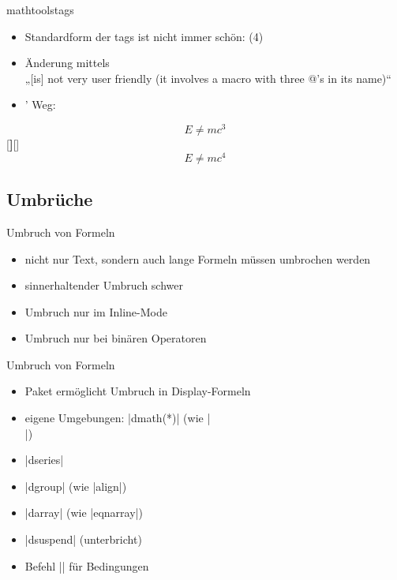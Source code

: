 \documentclass[
	vorläufig=false,
	datum=2022-11-02,
	titel={Mathematiksatz II},
	web=true,
	max,
	aspectratio=1610,
]{../tex/latexkurs-slides}
\begin{document}
\begin{frame}[fragile]{mathtools}{tags}
\begin{itemize}
\item Standardform der tags ist nicht immer schön: (4)
\item Änderung mittels \\%
„[is] not very user friendly (it involves a macro with three @’s in its name)“
\item {}’ Weg:
\end{itemize} 
\begin{LTXexample}[width=.3\textwidth]
\begin{equation}E \neq mc^3\end{equation}
[\textbf]{[}{]}
\begin{equation}E \neq mc^4\end{equation}
\end{LTXexample}
\end{frame}


\subsection{Umbrüche}
\begin{frame}{Umbruch von Formeln}
\begin{itemize}
\item nicht nur Text, sondern auch lange Formeln müssen umbrochen werden
\item sinnerhaltender Umbruch schwer
\item Umbruch nur im Inline-Mode
\item Umbruch nur bei binären Operatoren
\end{itemize}
\end{frame}

\begin{frame}[fragile]{Umbruch von Formeln}
\begin{itemize}
\item Paket  ermöglicht Umbruch in Display-Formeln
\item eigene Umgebungen: |dmath(*)| (wie |\[ \]|)
\item |dseries| 
\item |dgroup| (wie |align|)
\item |darray| (wie |eqnarray|)
\item |dsuspend| (unterbricht)
\item Befehl |\condition| für Bedingungen
\end{itemize}
\end{frame}
\end{document}
